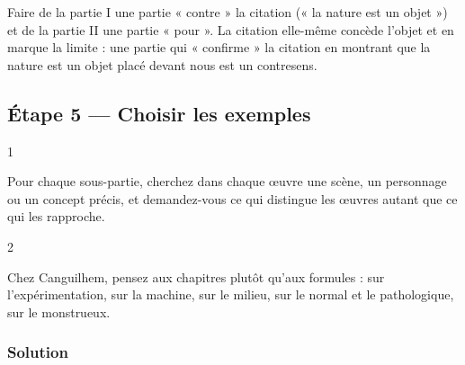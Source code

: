 \documentclass[11pt,a4paper]{article}
\begin{document}
\begin{piege}

Faire de la partie I une partie « contre » la citation (« la nature est un objet ») et de la partie II une partie « pour ». La citation elle-même concède l'objet et en marque la limite : une partie qui « confirme » la citation en montrant que la nature est un objet placé devant nous est un contresens.

\end{piege}

\hypertarget{uxe9tape-5-choisir-les-exemples}{%
\subsection{Étape 5 --- Choisir les exemples}\label{uxe9tape-5-choisir-les-exemples}}

\begin{indication}{1}

Pour chaque sous-partie, cherchez dans chaque œuvre une scène, un personnage ou un concept précis, et demandez-vous ce qui distingue les œuvres autant que ce qui les rapproche.

\end{indication}

\begin{indication}{2}

Chez Canguilhem, pensez aux chapitres plutôt qu'aux formules : sur l'expérimentation, sur la machine, sur le milieu, sur le normal et le pathologique, sur le monstrueux.

\end{indication}

\hypertarget{solution-4}{%
\subsubsection{Solution}\label{solution-4}}
\end{document}
